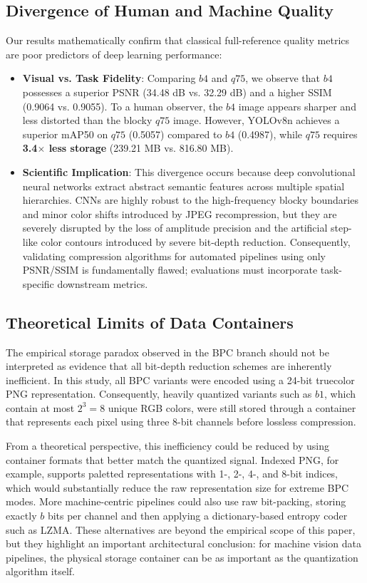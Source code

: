 \documentclass[12pt, a4paper]{article}
\begin{document}
\subsection{Divergence of Human and Machine Quality}
Our results mathematically confirm that classical full-reference quality metrics are poor predictors of deep learning performance:
\begin{itemize}
    \item \textbf{Visual vs. Task Fidelity}: Comparing $b4$ and $q75$, we observe that $b4$ possesses a superior PSNR (34.48 dB vs. 32.29 dB) and a higher SSIM (0.9064 vs. 0.9055). To a human observer, the $b4$ image appears sharper and less distorted than the blocky $q75$ image. However, YOLOv8n achieves a superior mAP50 on $q75$ (0.5057) compared to $b4$ (0.4987), while $q75$ requires \textbf{3.4$\times$ less storage} (239.21 MB vs. 816.80 MB).
    \item \textbf{Scientific Implication}: This divergence occurs because deep convolutional neural networks extract abstract semantic features across multiple spatial hierarchies. CNNs are highly robust to the high-frequency blocky boundaries and minor color shifts introduced by JPEG recompression, but they are severely disrupted by the loss of amplitude precision and the artificial step-like color contours introduced by severe bit-depth reduction. Consequently, validating compression algorithms for automated pipelines using only PSNR/SSIM is fundamentally flawed; evaluations must incorporate task-specific downstream metrics.
\end{itemize}

\subsection{Theoretical Limits of Data Containers}
The empirical storage paradox observed in the BPC branch should not be interpreted as evidence that all bit-depth reduction schemes are inherently inefficient. In this study, all BPC variants were encoded using a 24-bit truecolor PNG representation. Consequently, heavily quantized variants such as $b1$, which contain at most $2^3=8$ unique RGB colors, were still stored through a container that represents each pixel using three 8-bit channels before lossless compression.

From a theoretical perspective, this inefficiency could be reduced by using container formats that better match the quantized signal. Indexed PNG, for example, supports paletted representations with 1-, 2-, 4-, and 8-bit indices, which would substantially reduce the raw representation size for extreme BPC modes. More machine-centric pipelines could also use raw bit-packing, storing exactly $b$ bits per channel and then applying a dictionary-based entropy coder such as LZMA. These alternatives are beyond the empirical scope of this paper, but they highlight an important architectural conclusion: for machine vision data pipelines, the physical storage container can be as important as the quantization algorithm itself.
\end{document}
